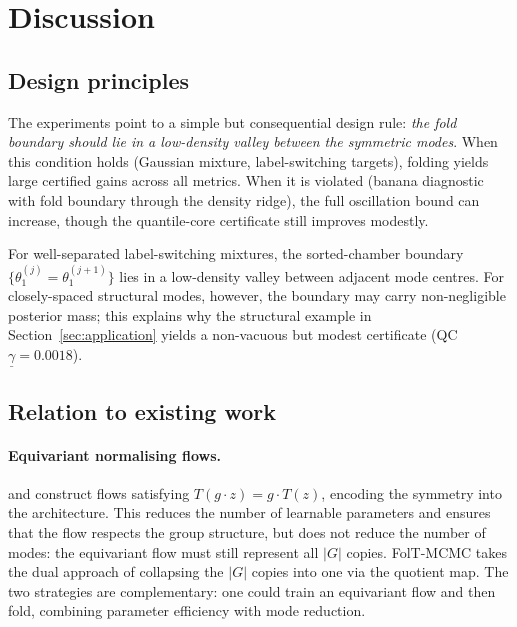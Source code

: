 %  

\section{Discussion}
\label{sec:discussion}


\subsection{Design principles}
\label{sec:disc_design}

The experiments point to a simple but consequential design rule:
\emph{the fold boundary should lie in a low-density valley between
the symmetric modes}.  When this condition holds (Gaussian mixture,
label-switching targets), folding yields large certified gains
across all metrics.  When it is violated (banana diagnostic with
fold boundary through the density ridge), the full oscillation
bound can increase, though the quantile-core certificate still
improves modestly.

For well-separated label-switching mixtures, the sorted-chamber
boundary $\{\theta_1^{(j)} = \theta_1^{(j+1)}\}$ lies in a
low-density valley between adjacent mode centres.
For closely-spaced structural modes, however, the boundary may
carry non-negligible posterior mass; this explains why the
structural example in Section~\ref{sec:application} yields a
non-vacuous but modest certificate
(QC~$\underline{\gamma} = 0.0018$).


\subsection{Relation to existing work}
\label{sec:disc_related}

\paragraph{Equivariant normalising flows.}
\citet{Kohler2020} and \citet{Rezende2019} construct flows
satisfying $T(g \cdot z) = g \cdot T(z)$, encoding the symmetry
into the architecture.  This reduces the number of learnable
parameters and ensures that the flow respects the group structure,
but does not reduce the number of modes: the equivariant flow must
still represent all $|G|$ copies.  FolT-MCMC takes the dual
approach of collapsing the $|G|$ copies into one via the quotient
map.  The two strategies are complementary: one could train an
equivariant flow and then fold, combining parameter efficiency
with mode reduction.

